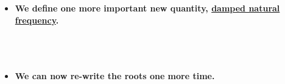 \documentclass[11pt]{article}
\begin{document}
\begin{itemize}
\\


\item \textbf{\large We define one more important new quantity, \underline{damped natural frequency}.}\\\\
	

 \\\\

\item \textbf{\large We can now re-write the roots one more time.}\\\\


\end{itemize}
\end{document}
